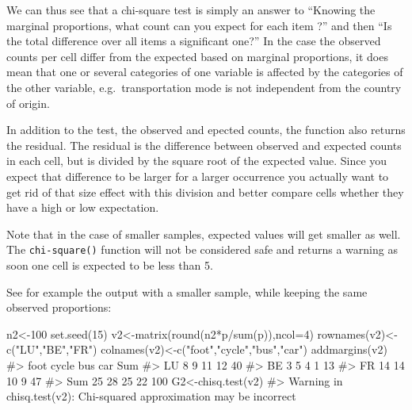 \documentclass[
  letterpaper,
  DIV=11,
  numbers=noendperiod]{scrreprt}
\newenvironment{Shaded}{\begin{snugshade}}{\end{snugshade}}
\newcommand{\AttributeTok}[1]{\textcolor[rgb]{0.40,0.45,0.13}{#1}}
\newcommand{\CommentTok}[1]{\textcolor[rgb]{0.37,0.37,0.37}{#1}}
\newcommand{\DecValTok}[1]{\textcolor[rgb]{0.68,0.00,0.00}{#1}}
\newcommand{\FunctionTok}[1]{\textcolor[rgb]{0.28,0.35,0.67}{#1}}
\newcommand{\NormalTok}[1]{\textcolor[rgb]{0.00,0.23,0.31}{#1}}
\newcommand{\OtherTok}[1]{\textcolor[rgb]{0.00,0.23,0.31}{#1}}
\newcommand{\SpecialCharTok}[1]{\textcolor[rgb]{0.37,0.37,0.37}{#1}}
\newcommand{\StringTok}[1]{\textcolor[rgb]{0.13,0.47,0.30}{#1}}
\begin{document}
We can thus see that a chi-square test is simply an answer to ``Knowing
the marginal proportions, what count can you expect for each item ?''
and then ``Is the total difference over all items a significant one?''
In the case the observed counts per cell differ from the expected based
on marginal proportions, it does mean that one or several categories of
one variable is affected by the categories of the other variable,
e.g.~transportation mode is not independent from the country of origin.

In addition to the test, the observed and epected counts, the function
also returns the residual. The residual is the difference between
observed and expected counts in each cell, but is divided by the square
root of the expected value. Since you expect that difference to be
larger for a larger occurrence you actually want to get rid of that size
effect with this division and better compare cells whether they have a
high or low expectation.

Note that in the case of smaller samples, expected values will get
smaller as well. The \texttt{chi-square()} function will not be
considered safe and returns a warning as soon one cell is expected to be
less than 5.

See for example the output with a smaller sample, while keeping the same
observed proportions:

\begin{Shaded}
\begin{Highlighting}[]
\NormalTok{n2}\OtherTok{\textless{}{-}}\DecValTok{100}
\FunctionTok{set.seed}\NormalTok{(}\DecValTok{15}\NormalTok{)}
\NormalTok{v2}\OtherTok{\textless{}{-}}\FunctionTok{matrix}\NormalTok{(}\FunctionTok{round}\NormalTok{(n2}\SpecialCharTok{*}\NormalTok{p}\SpecialCharTok{/}\FunctionTok{sum}\NormalTok{(p)),}\AttributeTok{ncol=}\DecValTok{4}\NormalTok{)}
\FunctionTok{rownames}\NormalTok{(v2)}\OtherTok{\textless{}{-}}\FunctionTok{c}\NormalTok{(}\StringTok{"LU"}\NormalTok{,}\StringTok{"BE"}\NormalTok{,}\StringTok{"FR"}\NormalTok{)}
\FunctionTok{colnames}\NormalTok{(v2)}\OtherTok{\textless{}{-}}\FunctionTok{c}\NormalTok{(}\StringTok{"foot"}\NormalTok{,}\StringTok{"cycle"}\NormalTok{,}\StringTok{"bus"}\NormalTok{,}\StringTok{"car"}\NormalTok{)}
\FunctionTok{addmargins}\NormalTok{(v2)}
\CommentTok{\#\textgreater{}     foot cycle bus car Sum}
\CommentTok{\#\textgreater{} LU     8     9  11  12  40}
\CommentTok{\#\textgreater{} BE     3     5   4   1  13}
\CommentTok{\#\textgreater{} FR    14    14  10   9  47}
\CommentTok{\#\textgreater{} Sum   25    28  25  22 100}
\NormalTok{G2}\OtherTok{\textless{}{-}}\FunctionTok{chisq.test}\NormalTok{(v2)}
\CommentTok{\#\textgreater{} Warning in chisq.test(v2): Chi{-}squared approximation may be incorrect}
\end{Highlighting}
\end{Shaded}
\end{document}
